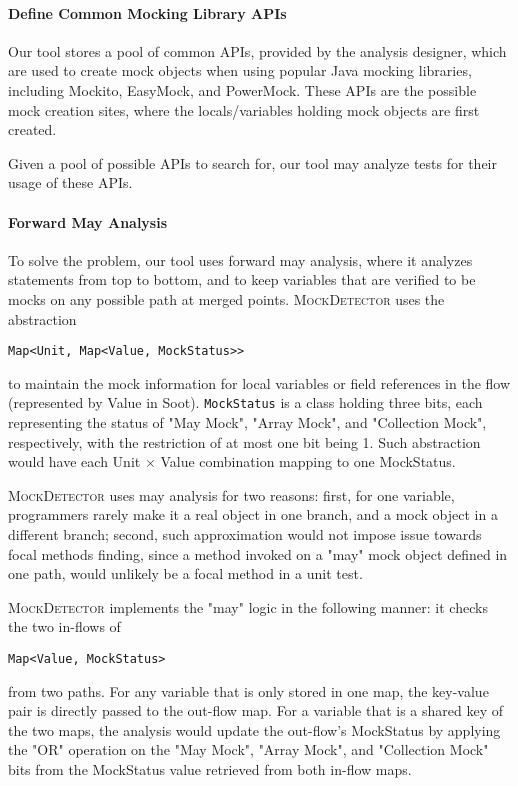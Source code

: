 \paragraph{Define Common Mocking Library APIs}
\label{subsubsec:collection}

Our tool stores a pool of common APIs, provided by the analysis designer, which are used to create mock objects when using popular Java mocking libraries, including Mockito, EasyMock, and PowerMock. These APIs are the possible mock creation sites, where the locals/variables holding mock objects are first created.

Given a pool of possible APIs to search for, our tool may analyze tests for their usage of these APIs.%


\paragraph{Forward May Analysis}
\label{subsubsec:forward}

To solve the problem, our tool uses forward may analysis, where it analyzes statements from top to bottom, and to keep variables that are verified to be mocks on any possible path at merged points. \textsc{MockDetector} uses the abstraction 

\begin{lstlisting}[basicstyle=\ttfamily\small,numbers=none]
Map<Unit, Map<Value, MockStatus>>
\end{lstlisting}
to maintain the mock information for local variables or field references in the flow (represented by Value in Soot). \texttt{MockStatus} is a class holding three bits, each representing the status of "May Mock", "Array Mock", and "Collection Mock", respectively, with the restriction of at most one bit being 1. Such abstraction would have each Unit $\times$ Value combination mapping to one MockStatus.

\textsc{MockDetector} uses may analysis for two reasons: first, for one variable, programmers rarely make it a real object in one branch, and a mock object in a different branch; second, such approximation would not impose issue towards focal methods finding, since a method invoked on a "may" mock object defined in one path, would unlikely be a focal method in a unit test. 


\textsc{MockDetector} implements the "may" logic in the following manner: it checks the two in-flows 
of \begin{lstlisting}[basicstyle=\ttfamily\small,numbers=none]
Map<Value, MockStatus>
\end{lstlisting}
from two paths. For any variable that is only stored in one map, the key-value pair is directly passed to the out-flow map. For a variable that is a shared key of the two maps, the analysis would update the out-flow's MockStatus by applying the "OR" operation on the "May Mock", "Array Mock", and "Collection Mock" bits from the MockStatus value retrieved from both in-flow maps. 

